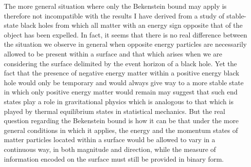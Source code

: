 \documentclass[notitlepage,12pt]{report}
\begin{document}
The more general situation where only the Bekenstein bound may apply is therefore not incompatible with the results I have derived from a study of stable-state black holes from which all matter with an energy sign opposite that of the object has been expelled. In fact, it seems that there is no real difference between the situation we observe in general when opposite energy particles are necessarily allowed to be present within a surface and that which arises when we are considering the surface delimited by the event horizon of a black hole. Yet the fact that the presence of negative energy matter within a positive energy black hole would only be temporary and would always give way to a more stable state in which only positive energy matter would remain may suggest that such end states play a role in gravitational physics which is analogous to that which is played by thermal equilibrium states in statistical mechanics. But the real question regarding the Bekenstein bound is how it can be that under the more general conditions in which it applies, the energy and the momentum states of matter particles located within a surface would be allowed to vary in a continuous way, in both magnitude and direction, while the measure of information encoded on the surface must still be provided in binary form.
\end{document}
